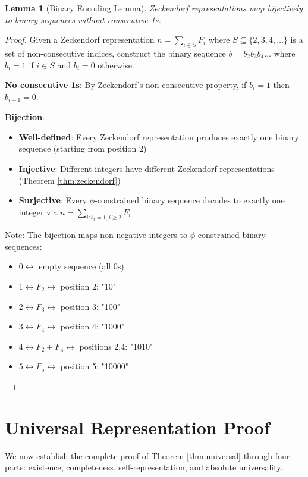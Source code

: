 \documentclass[12pt,letterpaper]{article}
\newtheorem{lemma}[theorem]{Lemma}
\begin{document}
\begin{lemma}[Binary Encoding Lemma]
\label{lem:binary_encoding}
Zeckendorf representations map bijectively to binary sequences without consecutive 1s.
\end{lemma}

\begin{proof}
Given a Zeckendorf representation $n = \sum_{i \in S} F_i$ where $S \subseteq \{2, 3, 4, \ldots\}$ is a set of non-consecutive indices, construct the binary sequence $b = b_2b_3b_4\ldots$ where $b_i = 1$ if $i \in S$ and $b_i = 0$ otherwise.

\textbf{No consecutive 1s}: By Zeckendorf's non-consecutive property, if $b_i = 1$ then $b_{i+1} = 0$.

\textbf{Bijection}: 
\begin{itemize}
\item \textbf{Well-defined}: Every Zeckendorf representation produces exactly one binary sequence (starting from position 2)
\item \textbf{Injective}: Different integers have different Zeckendorf representations (Theorem \ref{thm:zeckendorf})
\item \textbf{Surjective}: Every $\phi$-constrained binary sequence decodes to exactly one integer via $n = \sum_{i: b_i=1, i \geq 2} F_i$
\end{itemize}

Note: The bijection maps non-negative integers to $\phi$-constrained binary sequences:
\begin{itemize}
\item $0 \leftrightarrow$ empty sequence (all 0s)
\item $1 \leftrightarrow F_2 \leftrightarrow$ position 2: "10"
\item $2 \leftrightarrow F_3 \leftrightarrow$ position 3: "100" 
\item $3 \leftrightarrow F_4 \leftrightarrow$ position 4: "1000"
\item $4 \leftrightarrow F_2 + F_4 \leftrightarrow$ positions 2,4: "1010"
\item $5 \leftrightarrow F_5 \leftrightarrow$ position 5: "10000"
\end{itemize}
\end{proof}

\section{Universal Representation Proof}

We now establish the complete proof of Theorem \ref{thm:universal} through four parts: existence, completeness, self-representation, and absolute universality.
\end{document}
